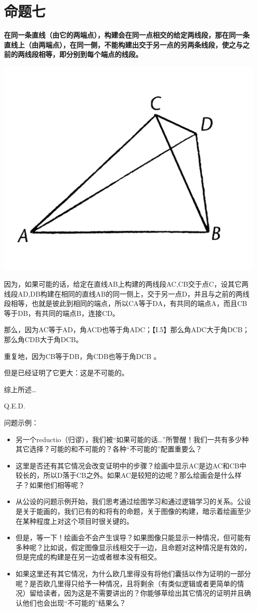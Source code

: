 \documentclass[
]{book}
\providecommand{\tightlist}{%
  \setlength{\itemsep}{0pt}\setlength{\parskip}{0pt}}
\begin{document}
\hypertarget{ux547dux9898ux4e03}{%
\section{命题七}\label{ux547dux9898ux4e03}}

\textbf{在同一条直线（由它的两端点），构建会在同一点相交的给定两线段，那在同一条直线上（由两端点），在同一侧，不能构建出交于另一点的另两条线段，使之与之前的两线段相等，即分别到每个端点的线段。}

\includegraphics[width=0.3\linewidth]{./image/img461}

因为，如果可能的话，给定在直线AB上构建的两线段AC,CB交于点C，设其它两线段AD,DB构建在相同的直线AB的同一侧上，交于另一点D，并且与之前的两线段相等，也就是彼此到相同的端点，所以CA等于DA，有共同的端点A，而且CB等于DB，有共同的端点B，连接CD。

那么，因为AC等于AD，角ACD也等于角ADC；【I.5】那么角ADC大于角DCB；那么角CDB大于角DCB。

重复地，因为CB等于DB，角CDB也等于角DCB 。

但是已经证明了它更大：这是不可能的。

综上所述\ldots{}

Q.E.D.

问题示例：

\begin{itemize}
\tightlist
\item
  另一个reductio（归谬），我们被``如果可能的话\ldots''所警醒！我们一共有多少种其它选择？可能的和不可能的？各种``不可能的''配置重要么？
\item
  这里是否还有其它情况会改变证明中的步骤？绘画中显示AC是边AC和CB中较长的，所以D落于CB之外。如果AC是较短的边呢？那么绘画会是什么样子？如果他们相等呢？
\item
  从公设的问题示例开始，我们思考通过绘图学习和通过逻辑学习的关系。公设是关于能画的，我们已有的和将有的命题，关于图像的构建，暗示着绘画至少在某种程度上对这个项目时很关键的。
\item
  但是，等一下！绘画会不会产生误导？如果图像只能显示一种情况，但可能有多种呢？比如说，假定图像显示线相交于一边，且命题对这种情况是有效的，但是完成的构建是在另一边或者根本没有相交。
\item
  如果这里还有其它情况，为什么欧几里得没有将他们囊括以作为证明的一部分呢？是否欧几里得只给予一种情况，且将剩余（有类似逻辑或者更简单的情况）留给读者，因为这是不需要讲出的？你能够草绘出其它情况的证明并且确认他们也会出现``不可能的''结果么？
\end{itemize}
\end{document}
